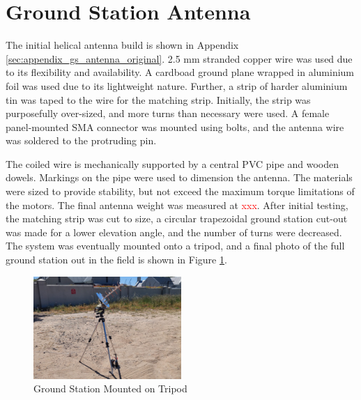 \graphicspath{{./figures}}

\section{Ground Station Antenna}

The initial helical antenna build is shown in Appendix \ref{sec:appendix_gs_antenna_original}. 2.5 mm stranded copper wire was used due to its flexibility and availability. A cardboad ground plane wrapped in aluminium foil was used due to its lightweight nature. Further, a strip of harder aluminium tin was taped to the wire for the matching strip. Initially, the strip was purposefully over-sized, and more turns than necessary were used. A female panel-mounted SMA connector was mounted using bolts, and the antenna wire was soldered to the protruding pin.

The coiled wire is mechanically supported by a central PVC pipe and wooden dowels. Markings on the pipe were used to dimension the antenna. The materials were sized to provide stability, but not exceed the maximum torque limitations of the motors. The final antenna weight was measured at \textcolor{red}{xxx}. After initial testing, the matching strip was cut to size, a circular trapezoidal ground station cut-out was made for a lower elevation angle, and the number of turns were decreased. The system was eventually mounted onto a tripod, and a final photo of the full ground station out in the field is shown in Figure \ref{fig:gsTripod}.

\begin{figure}[!htb]
  \centering
  \includegraphics[width=0.5\textwidth]{gsTripod}
  \caption{Ground Station Mounted on Tripod}
  \label{fig:gsTripod}
\end{figure}